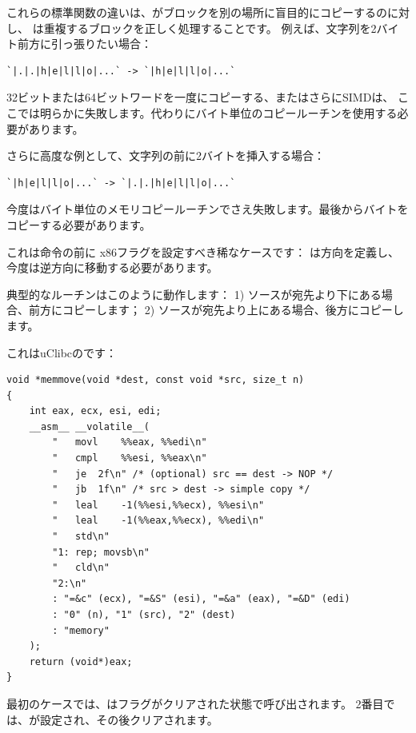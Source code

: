 \label{memmove_and_DF}

これらの標準関数の違いは、がブロックを別の場所に盲目的にコピーするのに対し、
は重複するブロックを正しく処理することです。
例えば、文字列を2バイト前方に引っ張りたい場合：

\begin{lstlisting}
`|.|.|h|e|l|l|o|...` -> `|h|e|l|l|o|...`
\end{lstlisting}

32ビットまたは64ビットワードを一度にコピーする、またはさらに\ac{SIMD}は、
ここでは明らかに失敗します。代わりにバイト単位のコピールーチンを使用する必要があります。

さらに高度な例として、文字列の前に2バイトを挿入する場合：

\begin{lstlisting}
`|h|e|l|l|o|...` -> `|.|.|h|e|l|l|o|...`
\end{lstlisting}

今度はバイト単位のメモリコピールーチンでさえ失敗します。最後からバイトをコピーする必要があります。

これは命令の前に x86フラグを設定すべき稀なケースです：
は方向を定義し、今度は逆方向に移動する必要があります。

典型的なルーチンはこのように動作します：
1) ソースが宛先より下にある場合、前方にコピーします；
2) ソースが宛先より上にある場合、後方にコピーします。

これはuClibcのです：

\begin{lstlisting}[style=customc]
void *memmove(void *dest, const void *src, size_t n)
{
	int eax, ecx, esi, edi;
	__asm__ __volatile__(
		"	movl	%%eax, %%edi\n"
		"	cmpl	%%esi, %%eax\n"
		"	je	2f\n" /* (optional) src == dest -> NOP */
		"	jb	1f\n" /* src > dest -> simple copy */
		"	leal	-1(%%esi,%%ecx), %%esi\n"
		"	leal	-1(%%eax,%%ecx), %%edi\n"
		"	std\n"
		"1:	rep; movsb\n"
		"	cld\n"
		"2:\n"
		: "=&c" (ecx), "=&S" (esi), "=&a" (eax), "=&D" (edi)
		: "0" (n), "1" (src), "2" (dest)
		: "memory"
	);
	return (void*)eax;
}
\end{lstlisting}

最初のケースでは、はフラグがクリアされた状態で呼び出されます。
2番目では、が設定され、その後クリアされます。

